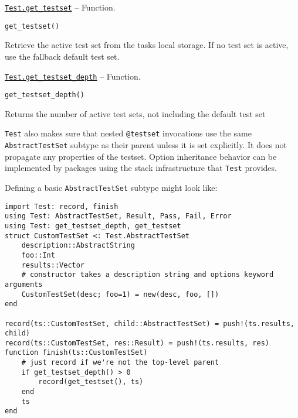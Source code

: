 \hypertarget{16535119297156519849}{} 
\hyperlink{16535119297156519849}{\texttt{Test.get\_testset}}  -- {Function.}

\begin{adjustwidth}{2em}{0pt}


\begin{verbatim}
get_testset()
\end{verbatim}

Retrieve the active test set from the task{\textquotesingle}s local storage. If no test set is active, use the fallback default test set.



\end{adjustwidth}
\hypertarget{6664474132755078304}{} 
\hyperlink{6664474132755078304}{\texttt{Test.get\_testset\_depth}}  -- {Function.}

\begin{adjustwidth}{2em}{0pt}


\begin{verbatim}
get_testset_depth()
\end{verbatim}

Returns the number of active test sets, not including the default test set



\end{adjustwidth}

\texttt{Test} also makes sure that nested \texttt{@testset} invocations use the same \texttt{AbstractTestSet} subtype as their parent unless it is set explicitly. It does not propagate any properties of the testset. Option inheritance behavior can be implemented by packages using the stack infrastructure that \texttt{Test} provides.



Defining a basic \texttt{AbstractTestSet} subtype might look like:




\begin{verbatim}
import Test: record, finish
using Test: AbstractTestSet, Result, Pass, Fail, Error
using Test: get_testset_depth, get_testset
struct CustomTestSet <: Test.AbstractTestSet
    description::AbstractString
    foo::Int
    results::Vector
    # constructor takes a description string and options keyword arguments
    CustomTestSet(desc; foo=1) = new(desc, foo, [])
end

record(ts::CustomTestSet, child::AbstractTestSet) = push!(ts.results, child)
record(ts::CustomTestSet, res::Result) = push!(ts.results, res)
function finish(ts::CustomTestSet)
    # just record if we're not the top-level parent
    if get_testset_depth() > 0
        record(get_testset(), ts)
    end
    ts
end
\end{verbatim}



